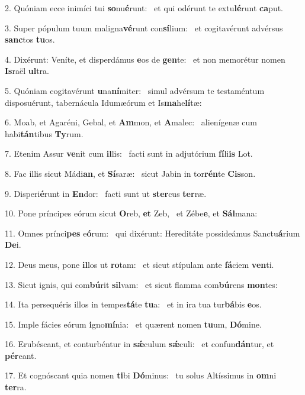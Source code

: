 2. Quóniam ecce inimíci tui \textbf{so}nu\textbf{é}runt: \ast\  et qui odérunt te extu\textbf{lé}runt \textbf{ca}put.\

3. Super pópulum tuum maligna\textbf{vé}runt con\textbf{sí}lium: \ast\  et cogitavérunt advérsus \textbf{sanc}tos \textbf{tu}os.\

4. Dixérunt: Veníte, et disperdámus \textbf{e}os de \textbf{gen}te: \ast\  et non memorétur nomen \textbf{Is}raël \textbf{ul}tra.\

5. Quóniam cogitavérunt \textbf{u}na\textbf{ní}miter: \ast\  simul advérsum te testaméntum disposuérunt, tabernácula Idumæórum et Is\textbf{ma}he\textbf{lí}tæ:\

6. Moab, et Agaréni, Gebal, et \textbf{Am}mon, et \textbf{A}malec: \ast\  alienígenæ cum habi\textbf{tán}tibus \textbf{Ty}rum.\

7. Etenim Assur \textbf{ve}nit cum \textbf{il}lis: \ast\  facti sunt in adjutórium \textbf{fí}li\textbf{is} Lot.\

8. Fac illis sicut Mádi\textbf{an}, et \textbf{Sí}saræ: \ast\  sicut Jabin in tor\textbf{rén}te \textbf{Cis}son.\

9. Disperi\textbf{é}runt in \textbf{En}dor: \ast\  facti sunt ut \textbf{ster}cus \textbf{ter}ræ.\

10. Pone príncipes eórum sicut \textbf{O}reb, \textbf{et} Zeb, \ast\  et Zébe\textbf{e}, et \textbf{Sál}mana:\

11. Omnes prínci\textbf{pes} e\textbf{ó}rum: \ast\  qui dixérunt: Hereditáte possideámus Sanctu\textbf{á}rium \textbf{De}i.\

12. Deus meus, pone \textbf{il}los ut \textbf{ro}tam: \ast\  et sicut stípulam ante \textbf{fá}ciem \textbf{ven}ti.\

13. Sicut ignis, qui com\textbf{bú}rit \textbf{sil}vam: \ast\  et sicut flamma com\textbf{bú}rens \textbf{mon}tes:\

14. Ita persequéris illos in tempes\textbf{tá}te \textbf{tu}a: \ast\  et in ira tua tur\textbf{bá}bis \textbf{e}os.\

15. Imple fácies eórum \textbf{i}gno\textbf{mí}nia: \ast\  et quærent nomen \textbf{tu}um, \textbf{Dó}mine.\

16. Erubéscant, et conturbéntur in \textbf{sǽ}culum \textbf{sǽ}culi: \ast\  et confun\textbf{dán}tur, et \textbf{pér}eant.\

17. Et cognóscant quia nomen \textbf{ti}bi \textbf{Dó}minus: \ast\  tu solus Altíssimus in \textbf{om}ni \textbf{ter}ra.\

